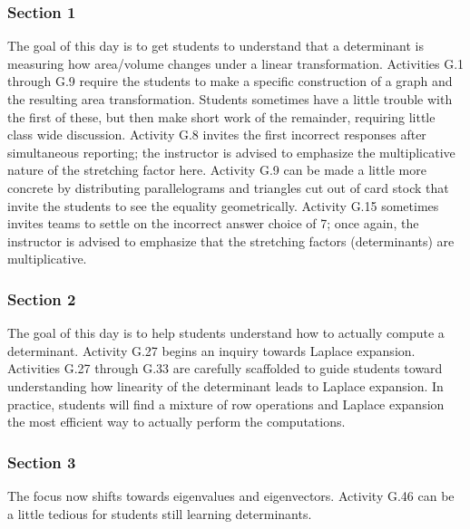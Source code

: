 \documentclass{article}
\begin{document}
\subsubsection*{Section 1}
The goal of this day is to get students to understand that a determinant is measuring how area/volume changes under a linear transformation.  Activities G.1 through G.9 require the students to make a specific construction of a graph and the resulting area transformation.  Students sometimes have a little trouble with the first of these, but then make short work of the remainder, requiring little class wide discussion.  Activity G.8 invites the first incorrect responses after simultaneous reporting; the instructor is advised to emphasize the multiplicative nature of the stretching factor here.  Activity G.9 can be made a little more concrete by distributing parallelograms and triangles cut out of card stock that invite the students to see the equality geometrically.  Activity G.15 sometimes invites teams to settle on the incorrect answer choice of 7; once again, the instructor is advised to emphasize that the stretching factors (determinants) are multiplicative.

\subsubsection*{Section 2}
The goal of this day is to help students understand how to actually compute a determinant.   Activity G.27 begins an inquiry towards Laplace expansion.  Activities G.27 through G.33 are carefully scaffolded to guide students toward understanding how linearity of the determinant leads to Laplace expansion.  In practice, students will find a mixture of row operations and Laplace expansion the most efficient way to actually perform the computations.

\subsubsection*{Section 3}
The focus now shifts towards eigenvalues and eigenvectors.  Activity G.46 can be a little tedious for students still learning determinants.  
\end{document}
